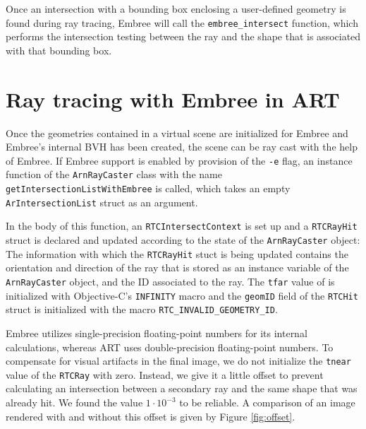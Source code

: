 Once an intersection with a bounding box enclosing a user-defined geometry is found during ray tracing, Embree will call the \texttt{embree\_intersect} function, which performs the intersection testing between the ray and the shape that is associated with that bounding box.




\section{Ray tracing with Embree in ART}
\label{sec:embree_raycasting}

Once the geometries contained in a virtual scene are initialized for Embree and Embree's internal BVH has been created, the scene can be ray cast with the help of Embree. If Embree support is enabled by provision of the \texttt{-e} flag, an instance function of the \texttt{ArnRayCaster} class with the name \texttt{getIntersectionListWithEmbree} is called, which takes an empty \texttt{ArIntersectionList} struct as an argument.

In the body of this function, an \texttt{RTCIntersectContext} is set up and a \texttt{RTCRayHit} struct is declared and updated according to the state of the \texttt{ArnRayCaster} object: The information with which the \texttt{RTCRayHit} stuct is being updated contains the orientation and direction of the ray that is stored as an instance variable of the \texttt{ArnRayCaster} object, and the ID associated to the ray. The \texttt{tfar} value of is initialized with Objective-C's \texttt{INFINITY} macro and the \texttt{geomID} field of the \texttt{RTCHit} struct is initialized with the macro \texttt{RTC\_INVALID\_GEOMETRY\_ID}. 

Embree utilizes single-precision floating-point numbers for its internal calculations, whereas ART uses double-precision floating-point numbers. To compensate for visual artifacts in the final image, we do not initialize the \texttt{tnear} value of the \texttt{RTCRay} with zero. Instead, we give it a little offset to prevent calculating an intersection between a secondary ray and the same shape that was already hit. We found the value $1\cdot 10^{-3}$ to be reliable. A comparison of an image rendered with and without this offset is given by Figure \ref{fig:offset}.

